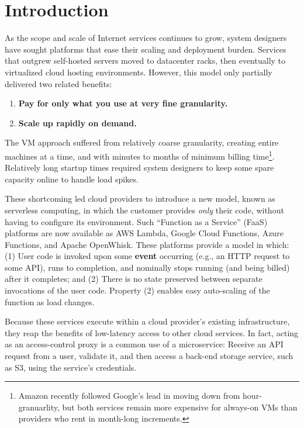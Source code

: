 \section{Introduction}
\label{sec:intro}

As the scope and scale of Internet services continues to grow, system designers
have sought platforms that ease their scaling and deployment burden.
Services that outgrew self-hosted servers moved to datacenter racks, then eventually to virtualized cloud hosting environments.
However, this model only partially delivered two related benefits:
\begin{enumerate}
\item \textbf{Pay for only what you use at very fine granularity.}
\item \textbf{Scale up rapidly on demand.}
\end{enumerate}

The VM approach suffered from relatively coarse granularity, creating entire
machines at a time, and with minutes to months of minimum billing
time\footnote{Amazon recently followed Google's lead in moving down from
  hour-granuarlity, but both services remain more expensive for always-on VMs
  than providers who rent in month-long increments.}.  Relatively long startup
times required system designers to keep some spare capacity online to handle load
spikes.

These shortcoming led cloud providers to introduce a new model, known as
serverless computing, in which the customer provides \textit{only} their code,
without having to configure its environment.   Such ``Function as a Service''
(FaaS) platforms are now available as AWS Lambda, Google Cloud Functions, Azure
Functions, and Apache OpenWhisk.  These platforms provide a model in which:
(1)  User code is invoked upon some \textbf{event} occurring (e.g., an HTTP
request to some API), runs to completion, and nominally stops running (and being
billed) after it completes; and (2)  There is no state preserved between
separate invocations of the user code.  Property (2) enables easy auto-scaling
of the function as load changes.

Because these services execute within a cloud provider's existing
infrastructure, they reap the benefits of low-latency access to other cloud
services.  In fact, acting as an access-control proxy is a common use of a
microservice:  Receive an API request from a user, validate it, and then access
a back-end storage service, such as S3, using the service's credentials.

